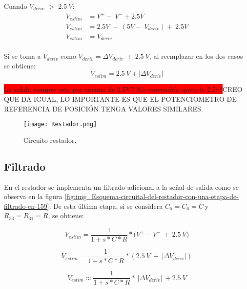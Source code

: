 Cuando $V_{deriv}$ $\mathrm{>}$ $2.5\:V$: 
\begin{equation*} 
	\begin{aligned}
		V_{estim}&=V^+-\ V^-+2.5V\\ 
		V_{estim}&=2.5V\ -\ (5V-\ V_{deriv})+\ 2.5V\\
		V_{estim}&=V_{deriv}\\
	\end{aligned}
\end{equation*}

Si se toma a $V_{deriv}$ como $V_{deriv}=\mathit{\Delta}V_{deriv}\ +\ 2.5\: V$, al reemplazar en los dos casos se obtiene:
\begin{equation} \label{eq_rest_3}
	V_{estim}= 2.5\:V + |\mathit{\Delta}V_{deriv}|
\end{equation}

\colorbox{red}{La salida siempre esta por encima de 2.5V? No convendría quitarle 2.5v?}CREO QUE DA IGUAL, LO IMPORTANTE ES QUE EL POTENCIOMETRO DE REFERENCIA DE POSICIÓN TENGA VALORES SIMILARES.

\begin{figure}[H]
	\centering
	\texttt{[image: Restador.png]}
	\caption{Circuito restador.}
	\label{fig:img_Restador}
\end{figure}

\subsection{Filtrado}

En el restador se implementa un filtrado adicional a la señal de salida como se observa en la figura  \ref{fig:img_Esquema-circuital-del-restador-con-una-etapa-de-filtrado-en-159}. De esta \'{u}ltima etapa, si se considera $C_5=C_6=C\ $y $R_{33}=R_{31}=R$, se obtiene:



\begin{equation}
	V_{estim}=\frac{1}{1+s*C*R}*{(V}^+-V^-\ +\ 2.5\:V)
\end{equation}

\begin{equation} \label{eq_Vestim_1}
	V_{estim}=\frac{1}{1+s*C*R}*(2.5\: V\ +\ |\mathit{\Delta}V_{deriv}|)
\end{equation}

\begin{equation} \label{eq_Vestim_2}
	V_{estim} \approx \frac{1}{1+s*C*R}*\ |\mathit{\Delta}V_{deriv}|\ +2.5\:V
\end{equation}



